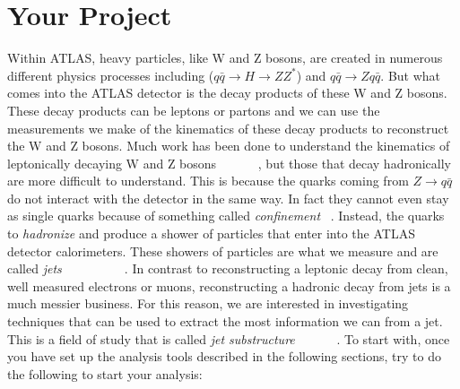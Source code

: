 \documentclass[12pt]{article}
\begin{document}
\section{Your Project}

Within ATLAS, heavy particles, like W and Z bosons, are created in numerous different physics processes including ($q\bar{q}\rightarrow H \rightarrow ZZ^{*}$) and $q\bar{q}\rightarrow Zq\bar{q}$.  But what comes into the ATLAS detector is the decay products of these W and Z bosons.  These decay products can be leptons or partons and we can use the measurements we make of the kinematics of these decay products to reconstruct the W and Z bosons.  Much work has been done to understand the kinematics of leptonically decaying W and Z bosons ~\cite{Wboson_1} ~\cite{Zboson_1} ~\cite{WZboson} ~\cite{WZboson_2}, but those that decay hadronically are more difficult to understand.  This is because the quarks coming from $Z\rightarrow q\bar{q}$ do not interact with the detector in the same way.  In fact they cannot even stay as single quarks because of something called \textit{confinement} ~\cite{confinement}.  Instead, the quarks to \textit{hadronize} and produce a shower of particles that enter into the ATLAS detector calorimeters.  These showers of particles are what we measure and are called \textit{jets} ~\cite{jet_0} ~\cite{jet_1} ~\cite{jet_2} ~\cite{jet_3} ~\cite{jet_4} ~\cite{jet_5}.  In contrast to reconstructing a leptonic decay from clean, well measured electrons or muons, reconstructing a hadronic decay from jets is a much messier business.  For this reason, we are interested in investigating techniques that can be used to extract the most information we can from a jet.  This is a field of study that is called \textit{jet substructure} ~\cite{jetss_1} ~\cite{jetss_2} ~\cite{jetss_3} ~\cite{jetss_4}.  To start with, once you have set up the analysis tools described in the following sections, try to do the following to start your analysis:
\end{document}
